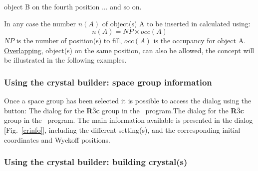 \begin{enumerate}
\begin{itemize}
\begin{itemize}
object B on the fourth position ... and so on.
\end{itemize}
In any case the number $n(A)$ of object(s) A to be inserted in calculated using:
\begin{equation} n(A) = NP \times occ(A) \nonumber \end{equation}
$NP$ is the number of position(s) to fill, $occ(A)$ is the occupancy for object A.\\
\underline{Overlapping}, object(s) on the same position, can also be allowed, the concept will be illustrated in the following examples.
\end{itemize}
\end{enumerate}

\clearpage

\subsubsection*{Using the crystal builder: space group information}

Once a space group has been selected it is possible to access the  dialog using the  button:
{The  dialog for the {\bf{R$\bar{3}$c}} group in the \atomes\ program.}{The  dialog for the {\bf{R$\bar{3}$c}} group in the \atomes\ program.}
\laf The main information available is presented in the  dialog [Fig.~\ref{crinfo}], including the different setting(s), 
and the corresponding initial coordinates and Wyckoff positions. 

\newpage

\subsubsection*{Using the crystal builder: building crystal(s)}

